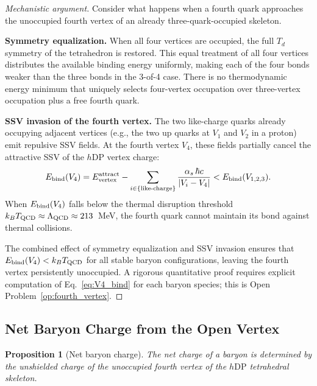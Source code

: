 \documentclass[12pt]{article}
\newtheorem{proposition}[theorem]{Proposition}
\newcommand{\hDP}{h\mathrm{DP}}
\newcommand{\as}{\alpha_s}
\begin{document}
\begin{proof}[Mechanistic argument]
Consider what happens when a fourth quark approaches the unoccupied
fourth vertex of an already three-quark-occupied skeleton.

\textbf{Symmetry equalization.}  When all four vertices are occupied,
the full $T_d$ symmetry of the tetrahedron is restored.  This equal
treatment of all four vertices distributes the available binding
energy uniformly, making each of the four bonds weaker than the
three bonds in the 3-of-4 case.  There is no thermodynamic energy
minimum that uniquely selects four-vertex occupation over three-vertex
occupation plus a free fourth quark.

\textbf{SSV invasion of the fourth vertex.}  The two like-charge
quarks already occupying adjacent vertices (e.g., the two up quarks
at $V_1$ and $V_2$ in a proton) emit repulsive SSV fields.  At the
fourth vertex $V_4$, these fields partially cancel the attractive
SSV of the $\hDP$ vertex charge:
\begin{equation}
E_{\rm bind}(V_4) = E_{\rm vertex}^{\rm attract}
- \sum_{i \in \{\rm like\text{-}charge\}} \frac{\as\,\hbar c}{|V_i - V_4|}
< E_{\rm bind}(V_{1,2,3}).
\label{eq:V4_bind}
\end{equation}
When $E_{\rm bind}(V_4)$ falls below the thermal disruption threshold
$k_B T_{\rm QCD} \approx \Lambda_{\rm QCD} \approx 213$~MeV, the
fourth quark cannot maintain its bond against thermal collisions.

The combined effect of symmetry equalization and SSV invasion ensures
that $E_{\rm bind}(V_4) < k_B T_{\rm QCD}$ for all stable baryon
configurations, leaving the fourth vertex persistently unoccupied.
A rigorous quantitative proof requires explicit computation of
Eq.~\eqref{eq:V4_bind} for each baryon species; this is Open
Problem~\ref{op:fourth_vertex}.
\end{proof}

\subsection{Net Baryon Charge from the Open Vertex}

\begin{proposition}[Net baryon charge]
\label{prop:baryon_charge}
The net charge of a baryon is determined by the unshielded charge
of the unoccupied fourth vertex of the $\hDP$ tetrahedral skeleton.
\end{proposition}
\end{document}
